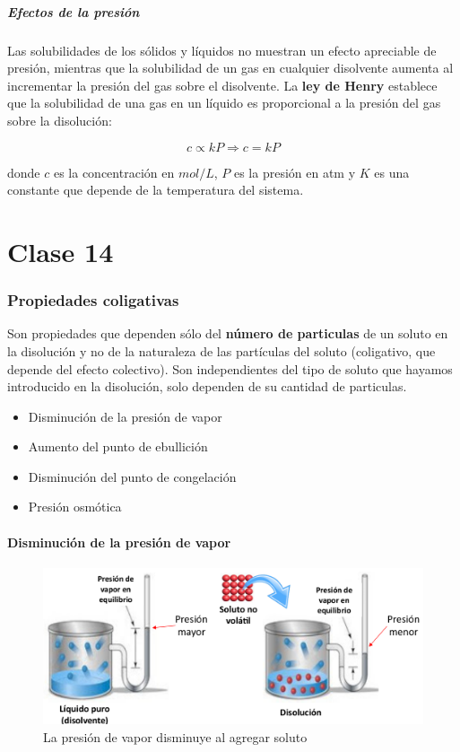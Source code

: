 \documentclass[]{article}
\begin{document}
\subsubsection{Efectos de la presión}
Las solubilidades de los sólidos y líquidos no muestran un efecto apreciable de presión, mientras que la solubilidad de un gas en cualquier disolvente aumenta al incrementar la presión del gas sobre el disolvente. La \textbf{ley de Henry} establece que la solubilidad de una gas en un líquido es proporcional a la presión del gas sobre la disolución:

\begin{equation}
c \varpropto kP  \Rightarrow c=kP
\end{equation}

donde $c$ es la concentración en $mol/L$, $P$ es la presión en atm y $K$ es una constante que depende de la temperatura del sistema. 



\part{Clase 14}



\section{Propiedades coligativas}
Son propiedades que dependen sólo del \textbf{número de particulas} de un soluto en la disolución y no de la naturaleza de las partículas del soluto (coligativo, que depende del efecto colectivo). Son independientes del tipo de soluto que hayamos introducido en la disolución, solo dependen de su cantidad de particulas.

\begin{itemize}
	\item Disminución de la presión de vapor
	\item Aumento del punto de ebullición
	\item Disminución del punto de congelación
	\item Presión osmótica
\end{itemize}



\subsection{Disminución de la presión de vapor}

\begin{figure}[H]
\center
\includegraphics[scale=0.33]{foto17.png}
\caption{La presión de vapor disminuye al agregar soluto}		
\end{figure}
\end{document}
